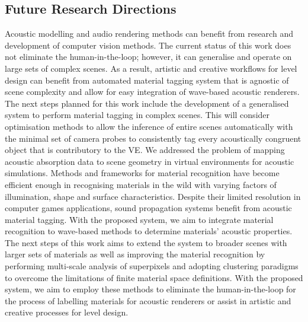 \subsection{Future Research Directions}
Acoustic modelling and audio rendering methods can benefit from research and development of computer vision methods. 
The current status of this work does not eliminate the human-in-the-loop; however, it can generalise and operate on large sets of complex scenes. As a result, artistic and creative workflows for level design can benefit from automated material tagging system that is agnostic of scene complexity and allow for easy integration of wave-based acoustic renderers.
The next steps planned for this work include the development of a generalised system to perform material tagging in complex scenes. This will consider optimisation methods to allow the inference of entire scenes automatically with the minimal set of camera probes to consistently tag every acoustically congruent object that is contributory to the VE. 
We addressed the problem of mapping acoustic absorption data to scene geometry in virtual environments for acoustic simulations. Methods and frameworks for material recognition have become efficient enough in recognising materials in the wild with varying factors of illumination, shape and surface characteristics. Despite their limited resolution in computer games applications, sound propagation systems benefit from acoustic material tagging. With the proposed system, we aim to integrate material recognition to wave-based methods to determine materials' acoustic properties.
The next steps of this work aims to extend the system to broader scenes with larger sets of materials as well as improving the material recognition by performing multi-scale analysis of superpixels and adopting clustering paradigms to overcome the limitations of finite material space definitions.
With the proposed system, we aim to employ these methods to eliminate the human-in-the-loop for the process of labelling materials for acoustic renderers or assist in artistic and creative processes for level design. 

